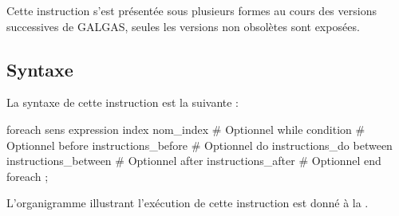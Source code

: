 Cette instruction s'est présentée sous plusieurs formes au cours des versions successives de GALGAS, seules les versions non obsolètes sont exposées.

\subsection{Syntaxe}

La syntaxe de cette instruction est la suivante :

\begin{galgascode}
foreach sens expression
index nom_index # Optionnel
while condition # Optionnel
before instructions_before  # Optionnel
do instructions_do
between instructions_between  # Optionnel
after instructions_after  # Optionnel
end foreach ;
\end{galgascode}


L'organigramme illustrant l'exécution de cette instruction est donné à la .

